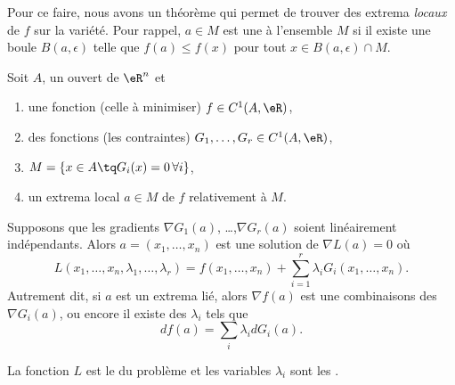 Pour ce faire, nous avons un théorème qui permet de trouver des extrema \emph{locaux} de $f$ sur la variété. Pour rappel, $a\in M$ est une  à l'ensemble $M$ si il existe une boule $B(a,\epsilon)$ telle que $f(a)\leq f(x)$ pour tout $x\in B(a,\epsilon)\cap M$.

\begin{theorem} \label{ThoRGJosS}
	Soit \( A\), un ouvert de \( \eR^n\) et
	\begin{enumerate}
		\item
			une fonction (celle à minimiser) $f\in C^1(A,\eR)$,
		\item 
			des fonctions (les contraintes) $G_1,\ldots,G_r\in C^1(A,\eR)$,
		\item
			$M=\{ x\in A\tq G_i(x)=0\,\forall i\}$,
		\item
			un extrema local $a\in M$ de $f$ relativement à $M$.
	\end{enumerate}
	Supposons que les gradients $\nabla G_1(a)$, \ldots,$\nabla G_r(a)$ soient linéairement indépendants. Alors $a=(x_1,\ldots,x_n)$ est une solution de \( \nabla L(a)=0\) où
	\begin{equation}
		L(x_1,\ldots,x_n,\lambda_1,\ldots,\lambda_r)=f(x_1,\ldots,x_n)+\sum_{i=1}^r\lambda_iG_i(x_1,\ldots,x_n).
	\end{equation}
    Autrement dit, si \( a\) est un extrema lié, alors \( \nabla f(a)\) est une combinaisons des \( \nabla G_i(a)\), ou encore il existe des \( \lambda_i\) tels que
    \begin{equation}    \label{EqRDsSXyZ}
        df(a)=\sum_i\lambda_idG_i(a).
    \end{equation}
\end{theorem}
La fonction $L$ est le  du problème et les variables \( \lambda_i\) sont les .

